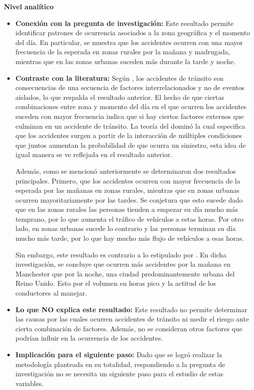 \documentclass[12pt]{article}
\begin{document}
\textbf{Nivel analítico}
\begin{itemize}
  \item \textbf{Conexión con la pregunta de investigación:} Este resultado permite 
  identificar patrones de ocurrencia asociados a la zona geográfica y el momento 
  del día. En particular, se muestra que los accidentes ocurren con una mayor 
  frecuencia de la esperada en zonas rurales por la mañana y madrugada, mientras 
  que en las zonas urbanas suceden más durante la tarde y noche. 
  
  \item \textbf{Contraste con la literatura:} 
    Según \textcite{SAXENA2017}, los accidentes de tránsito son consecuencias de una secuencia de factores interrelacionados y 
  no de eventos aislados, lo que respalda el resultado anterior. El hecho de que 
  ciertas combinaciones entre zona y momento del día en el que ocurren los accidentes
  suceden con mayor frecuencia indica que si hay ciertos factores externos que 
  culminan en un accidente de tránsito. La teoría del dominó la cual especifica 
  que los accidentes surgen a partir de la interacción de múltiples condiciones 
  que juntos aumentan la probabilidad de que ocurra un siniestro, esta idea de 
  igual manera se ve reflejada en el resultado anterior.
  
  Además, como se mencionó anteriormente se determinaron dos resultados principales.
  Primero, que los accidentes ocurren con mayor frecuencia de la esperada por las 
  mañanas en zonas rurales, mientras que en zonas urbanas ocurren mayoritariamente 
  por las tardes. Se conjetura que esto sucede dado que en las zonas rurales las 
  personas tienden a empezar su día mucho más temprano, por lo que aumenta el 
  tráfico de vehículos a estas horas. Por otro lado, en zonas urbanas sucede lo 
  contrario y las personas terminan su día mucho más tarde, por lo que hay mucho 
  más flujo de vehículos a esas horas.  
  
  Sin embargo, este resultado es contrario a lo estipulado por \textcite{KARZAN2017}. 
  En dicha investigación, se concluye que ocurren más accidentes por la mañana en 
  Manchester que por la noche, una ciudad predominantemente urbana del Reino Unido. 
  Esto por el volumen en horas pico y la actitud de los conductores al manejar.  

  \item \textbf{Lo que NO explica este resultado:} Este resultado no permite 
  determinar las causas por las cuales ocurren accidentes de tránsito ni medir 
  el riesgo ante cierta combinación de factores. Además, no se consideran otros 
  factores que podrían influir en la ocurrencia de los accidentes. 
  
  \item \textbf{Implicación para el siguiente paso:} Dado que se logró realizar 
  la metodología planteada en su totalidad, respondiendo a la pregunta de 
  investigación no se necesita un siguiente paso para el estudio de estas variables. \\ 


\end{itemize}
\end{document}
